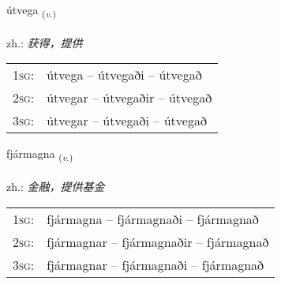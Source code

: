 \documentclass[frontgrid, backgrid]{flacards}\usepackage[]{graphicx}\usepackage[]{xcolor}
\begin{document}
\renewcommand{\flhead}{\vskip5pt \fboxsep=0pt {\small\bfseries\footnotesize Sagnorð | 动词}}
\renewcommand{\fcfoot}{\vskip5pt \fboxsep=0pt \hspace{2pt}{\small\bfseries\footnotesize 3K}}

\renewcommand{\blhead}{\vskip5pt {\small\bfseries\footnotesize Sagnorð | 动词 }}
\renewcommand{\bcfoot}{\vskip5pt \hspace{2pt}{\small\bfseries\footnotesize 3K}}


{útvega \small{\textsubscript{(\textit{v.})}} \\[1ex] %
\textphonetic{[uːtvɛɣa]} \\
zh.: \emph{获得，提供} \\  [2ex]
\renewcommand*{\arraystretch}{0.8}
\begin{tabular}{p{1cm}l}
\textsc{1sg}: & útvega -- útvegaði -- útvegað \\ 
\textsc{2sg}: & útvegar -- útvegaðir -- útvegað \\ 
\textsc{3sg}: & útvegar -- útvegaði -- útvegað \\ 
\end{tabular}
}

\renewcommand{\flhead}{\vskip5pt \fboxsep=0pt {\small\bfseries\footnotesize Sagnorð | 动词}}
\renewcommand{\fcfoot}{\vskip5pt \fboxsep=0pt \hspace{2pt}{\small\bfseries\footnotesize 3K}}

\renewcommand{\blhead}{\vskip5pt {\small\bfseries\footnotesize Sagnorð | 动词 }}
\renewcommand{\bcfoot}{\vskip5pt \hspace{2pt}{\small\bfseries\footnotesize 3K}}


{fjármagna \small{\textsubscript{(\textit{v.})}} \\[1ex] %
\textphonetic{[fjaurmakna]} \\
zh.: \emph{金融，提供基金} \\  [2ex]
\renewcommand*{\arraystretch}{0.8}
\begin{tabular}{p{1cm}l}
\textsc{1sg}: & fjármagna -- fjármagnaði -- fjármagnað \\ 
\textsc{2sg}: & fjármagnar -- fjármagnaðir -- fjármagnað \\ 
\textsc{3sg}: & fjármagnar -- fjármagnaði -- fjármagnað \\ 
\end{tabular}
}
\end{document}
